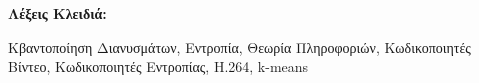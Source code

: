 ﻿\thispagestyle{plain}
\begin{abstract}

\end{abstract}
\vspace{0.5in}
\begin{Large}
\textbf{Λέξεις Κλειδιά:}\\
\end{Large}
Κβαντοποίηση Διανυσμάτων, Εντροπία, Θεωρία Πληροφοριών, Κωδικοποιητές Βίντεο, Κωδικοποιητές Εντροπίας, H.264, k-means 